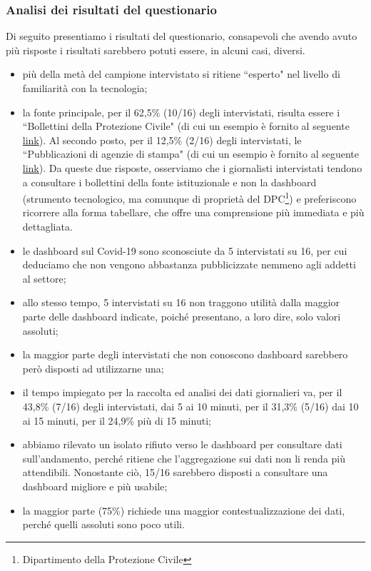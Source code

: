 \subsubsection{Analisi dei risultati del questionario}
Di seguito presentiamo i risultati del questionario, consapevoli che avendo avuto più risposte i risultati sarebbero potuti essere, in alcuni casi, diversi.
\begin{itemize}
    \item più della metà del campione intervistato si ritiene ``esperto" nel livello di familiarità con la tecnologia;
    \item la fonte principale, per il 62,5\% (10/16) degli intervistati, risulta essere i ``Bollettini della Protezione Civile" (di cui un esempio è fornito al seguente \href{https://github.com/pcm-dpc/COVID-19/blob/master/schede-riepilogative/regioni/dpc-covid19-ita-scheda-regioni-latest.pdf}{link}). Al secondo posto, per il 12,5\% (2/16) degli intervistati, le ``Pubblicazioni di agenzie di stampa" (di cui un esempio è fornito al seguente \href{https://www.ansa.it/canale_saluteebenessere/notizie/sanita/2021/01/02/covid-11.831-nuovi-casi-in-24-ore-364-vittime-_96b5a8cb-4922-492b-87ac-9d9c9590cca4.html}{link}).
    Da queste due risposte, osserviamo che i giornalisti intervistati tendono a consultare i bollettini della fonte istituzionale e non la dashboard (strumento tecnologico, ma comunque di proprietà del DPC\footnote{Dipartimento della Protezione Civile}) e preferiscono ricorrere alla forma tabellare, che offre una comprensione più immediata e più dettagliata.
    \item le dashboard sul Covid-19 sono sconosciute da 5 intervistati su 16, per cui deduciamo che non vengono abbastanza pubblicizzate nemmeno agli addetti al settore;
    \item allo stesso tempo, 5 intervistati su 16 non traggono utilità dalla maggior parte delle dashboard indicate, poiché presentano, a loro dire, solo valori assoluti;
    \item la maggior parte degli intervistati che non conoscono dashboard sarebbero però disposti ad utilizzarne una;
    \item il tempo impiegato per la raccolta ed analisi dei dati giornalieri va, per il 43,8\% (7/16) degli intervistati, dai 5 ai 10 minuti, per il 31,3\% (5/16) dai 10 ai 15 minuti, per il 24,9\% più di 15 minuti;
    \item abbiamo rilevato un isolato rifiuto verso le dashboard per consultare dati sull'andamento, perché ritiene che l'aggregazione sui dati non li renda più attendibili. Nonostante ciò, 15/16 sarebbero disposti a consultare una dashboard migliore e più usabile;
    \item la maggior parte (75\%) richiede una maggior contestualizzazione dei dati, perché quelli assoluti sono poco utili.
\end{itemize}


